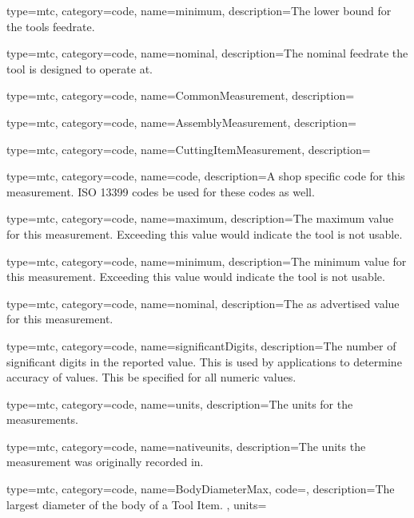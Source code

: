 {
  type=mtc,
  category=code,
  name={minimum},
  description={The lower bound for the tools feedrate.}
}


{
  type=mtc,
  category=code,
  name={nominal},
  description={The nominal feedrate the tool is designed to operate at.}
}


{
  type=mtc,
  category=code,
  name={CommonMeasurement},
  description={}
}


{
  type=mtc,
  category=code,
  name={AssemblyMeasurement},
  description={}
}


{
  type=mtc,
  category=code,
  name={CuttingItemMeasurement},
  description={}
}


{
  type=mtc,
  category=code,
  name={code},
  description={A shop specific code for this measurement. ISO 13399 codes \MAY be used for these codes as well.}
}


{
  type=mtc,
  category=code,
  name={maximum},
  description={The maximum value for this measurement. Exceeding this value would indicate the tool is not usable.}
}


{
  type=mtc,
  category=code,
  name={minimum},
  description={The minimum value for this measurement. Exceeding this value would indicate the tool is not usable.}
}


{
  type=mtc,
  category=code,
  name={nominal},
  description={The as advertised value for this measurement.}
}


{
  type=mtc,
  category=code,
  name={significantDigits},
  description={The number of significant digits in the reported value. This is used by applications to determine accuracy of values. This \MAY be specified for all numeric values.}
}


{
  type=mtc,
  category=code,
  name={units},
  description={The units for the measurements. }
}


{
  type=mtc,
  category=code,
  name={nativeunits},
  description={The units the measurement was originally recorded in. }
}


{
  type=mtc,
  category=code,
  name={BodyDiameterMax},
  code=,
  description={The largest diameter of the body of a Tool Item. },
  units=
}


